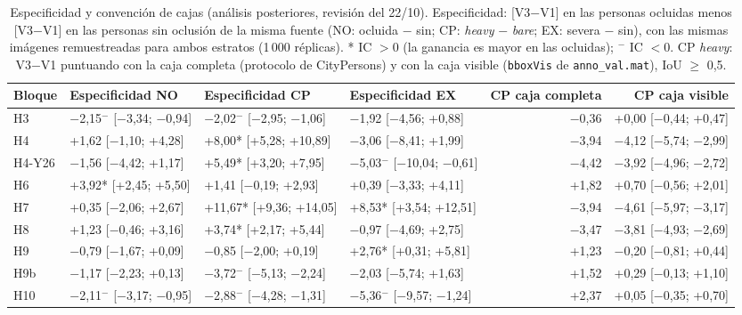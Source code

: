 \begin{table}[H]\centering\scriptsize
\caption{Especificidad y convención de cajas (análisis posteriores, revisión del 22/10). Especificidad: [V3$-$V1] en las personas ocluidas menos [V3$-$V1] en las personas sin oclusión de la misma fuente (NO: ocluida $-$ sin; CP: \emph{heavy} $-$ \emph{bare}; EX: severa $-$ sin), con las mismas imágenes remuestreadas para ambos estratos (1\,000 réplicas). * IC $>0$ (la ganancia es mayor en las ocluidas); $^-$ IC $<0$. CP \emph{heavy}: V3$-$V1 puntuando con la caja completa (protocolo de CityPersons) y con la caja visible (\texttt{bboxVis} de \texttt{anno\_val.mat}), IoU $\geq$ 0,5.}\label{tab:s-especificidad}
\setlength{\tabcolsep}{3pt}\begin{tabular}{@{}l lll rr@{}}\toprule
Bloque & Especificidad NO & Especificidad CP & Especificidad EX & CP caja completa & CP caja visible \\
\midrule
H3 & $-$2{,}15$^-$ [$-$3{,}34; $-$0{,}94] & $-$2{,}02$^-$ [$-$2{,}95; $-$1{,}06] & $-$1{,}92 [$-$4{,}56; +0{,}88] & $-$0{,}36 & +0{,}00 [$-$0{,}44; +0{,}47] \\
H4 & +1{,}62 [$-$1{,}10; +4{,}28] & +8{,}00* [+5{,}28; +10{,}89] & $-$3{,}06 [$-$8{,}41; +1{,}99] & $-$3{,}94 & $-$4{,}12 [$-$5{,}74; $-$2{,}99] \\
H4-Y26 & $-$1{,}56 [$-$4{,}42; +1{,}17] & +5{,}49* [+3{,}20; +7{,}95] & $-$5{,}03$^-$ [$-$10{,}04; $-$0{,}61] & $-$4{,}42 & $-$3{,}92 [$-$4{,}96; $-$2{,}72] \\
H6 & +3{,}92* [+2{,}45; +5{,}50] & +1{,}41 [$-$0{,}19; +2{,}93] & +0{,}39 [$-$3{,}33; +4{,}11] & +1{,}82 & +0{,}70 [$-$0{,}56; +2{,}01] \\
H7 & +0{,}35 [$-$2{,}06; +2{,}67] & +11{,}67* [+9{,}36; +14{,}05] & +8{,}53* [+3{,}54; +12{,}51] & $-$3{,}94 & $-$4{,}61 [$-$5{,}97; $-$3{,}17] \\
H8 & +1{,}23 [$-$0{,}46; +3{,}16] & +3{,}74* [+2{,}17; +5{,}44] & $-$0{,}97 [$-$4{,}69; +2{,}75] & $-$3{,}47 & $-$3{,}81 [$-$4{,}93; $-$2{,}69] \\
H9 & $-$0{,}79 [$-$1{,}67; +0{,}09] & $-$0{,}85 [$-$2{,}00; +0{,}19] & +2{,}76* [+0{,}31; +5{,}81] & +1{,}23 & $-$0{,}20 [$-$0{,}81; +0{,}44] \\
H9b & $-$1{,}17 [$-$2{,}23; +0{,}13] & $-$3{,}72$^-$ [$-$5{,}13; $-$2{,}24] & $-$2{,}03 [$-$5{,}74; +1{,}63] & +1{,}52 & +0{,}29 [$-$0{,}13; +1{,}10] \\
H10 & $-$2{,}11$^-$ [$-$3{,}17; $-$0{,}95] & $-$2{,}88$^-$ [$-$4{,}28; $-$1{,}31] & $-$5{,}36$^-$ [$-$9{,}57; $-$1{,}24] & +2{,}37 & +0{,}05 [$-$0{,}35; +0{,}70] \\

\end{tabular}
\end{table}

